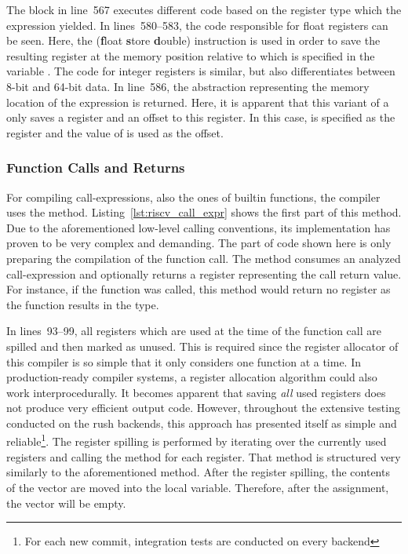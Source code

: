 The  block in line~567 executes different code based on the register type which the expression yielded.
In lines~580--583, the code responsible for float registers can be seen.
Here, the  (\textbf{f}loat \textbf{s}tore \textbf{d}ouble) instruction is used in order to save the resulting register at the memory position relative to  which is specified in the variable .
The code for integer registers is similar, but also differentiates between 8-bit and 64-bit data.
In line~586, the  abstraction representing the memory location of the expression is returned.
Here, it is apparent that this variant of a  only saves a register and an offset to this register.
In this case,  is specified as the register and the value of  is used as the offset.

\subsubsection{Function Calls and Returns}

For compiling call-expressions, also the ones of builtin functions, the compiler uses the  method.
Listing~\ref{lst:riscv_call_expr} shows the first part of this method.
Due to the aforementioned low-level calling conventions,
its implementation has proven to be very complex and demanding.
The part of code shown here is only preparing the compilation of the function call.
The method consumes an analyzed call-expression and optionally returns a register representing the call return value.
For instance, if the  function was called, this method would return no register as the  function results in the \qVerb{!} type.


In lines~93--99, all registers which are used at the time of the function call are spilled and then marked as unused.
This is required since the register allocator of this compiler is so simple that it only considers one function at a time.
In production-ready compiler systems, a register allocation algorithm could also work interprocedurally.
It becomes apparent that saving \emph{all} used registers does not produce very efficient output code.
However, throughout the extensive testing conducted on the rush backends, this approach has presented itself as simple and reliable\footnote{For each new commit, \rushCountTests integration tests are conducted on every backend}.
The register spilling is performed by iterating over the currently used registers and calling the  method for each register.
That method is structured very similarly to the aforementioned  method.
After the register spilling, the contents of the  vector are moved into the local  variable.
Therefore, after the assignment, the  vector will be empty.

